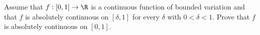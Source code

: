 Assume that $f:[0,1]\rightarrow \R$ is a continuous function of
bounded variation and that $f$ is absolutely continuous on
$[\delta,1]$ for every $\delta$ with $0<\delta<1$. Prove that $f$ is
absolutely continuous on $[0,1]$.

